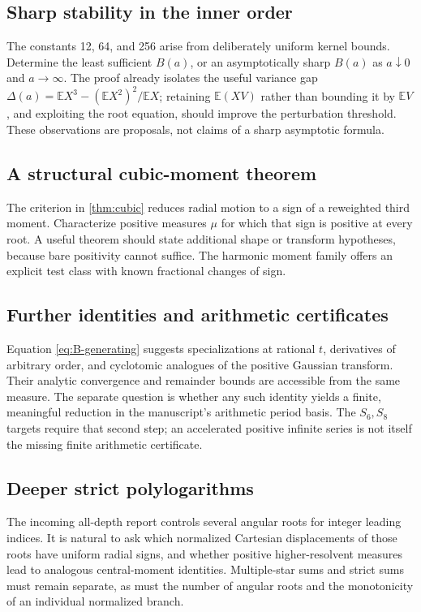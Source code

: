 \documentclass[11pt,letterpaper]{article}
\numberwithin{equation}{section}
\theoremstyle{definition}
\theoremstyle{remark}
\newcommand{\E}{\mathbb E}
\begin{document}
\subsection{Sharp stability in the inner order}
The constants 12, 64, and 256 arise from deliberately uniform kernel
bounds. Determine the least sufficient $B(a)$, or an asymptotically
sharp $B(a)$ as $a\downarrow0$ and $a\to\infty$. The proof already
isolates the useful variance gap
$\Delta(a)=\E X^3-(\E X^2)^2/\E X$; retaining $\E(XV)$ rather than
bounding it by $\E V$, and exploiting the root equation, should improve
the perturbation threshold. These observations are proposals, not
claims of a sharp asymptotic formula.

\subsection{A structural cubic-moment theorem}
The criterion in \cref{thm:cubic} reduces radial motion to a sign of a
reweighted third moment. Characterize positive measures $\mu$ for
which that sign is positive at every root. A useful theorem should
state additional shape or transform hypotheses, because bare
positivity cannot suffice. The harmonic moment family offers an
explicit test class with known fractional changes of sign.

\subsection{Further identities and arithmetic certificates}
Equation \eqref{eq:B-generating} suggests specializations at rational
$t$, derivatives of arbitrary order, and cyclotomic analogues of the
positive Gaussian transform. Their analytic convergence and remainder
bounds are accessible from the same measure. The separate question
is whether any such identity yields a finite, meaningful reduction
in the manuscript's arithmetic period basis. The $S_6,S_8$ targets
require that second step; an accelerated positive infinite series is
not itself the missing finite arithmetic certificate.

\subsection{Deeper strict polylogarithms}
The incoming all-depth report controls several angular roots for
integer leading indices. It is natural to ask which normalized
Cartesian displacements of those roots have uniform radial signs,
and whether positive higher-resolvent measures lead to analogous
central-moment identities. Multiple-star sums and strict sums must
remain separate, as must the number of angular roots and the
monotonicity of an individual normalized branch.
\end{document}
